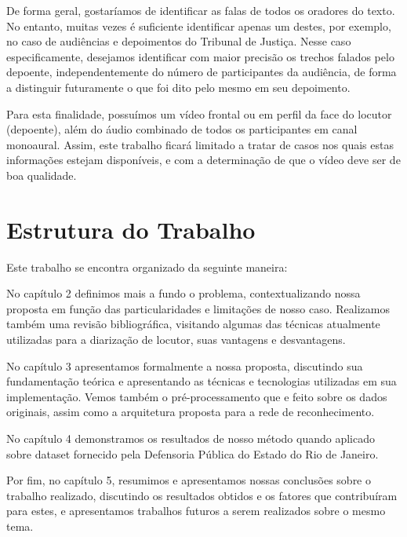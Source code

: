 De forma geral, gostaríamos de identificar as falas de todos os oradores do texto. No entanto, muitas vezes é suficiente identificar apenas um destes, por exemplo, no caso de audiências e depoimentos do Tribunal de Justiça. Nesse caso especificamente, desejamos identificar com maior precisão os trechos falados pelo depoente, independentemente do número de participantes da audiência, de forma a distinguir futuramente o que foi dito pelo mesmo em seu depoimento.

Para esta finalidade, possuímos um vídeo frontal ou em perfil da face do locutor (depoente), além do áudio combinado de todos os participantes em canal monoaural. Assim, este trabalho ficará limitado a tratar de casos nos quais estas informações estejam disponíveis, e com a determinação de que o vídeo deve ser de boa qualidade.

\section{Estrutura do Trabalho}

Este trabalho se encontra organizado da seguinte maneira:

No capítulo 2 definimos mais a fundo o problema, contextualizando nossa proposta em função das particularidades e limitações de nosso caso. Realizamos também uma revisão bibliográfica, visitando algumas das técnicas atualmente utilizadas para a diarização de locutor, suas vantagens e desvantagens.

No capítulo 3 apresentamos formalmente a nossa proposta, discutindo sua fundamentação teórica e apresentando as técnicas e tecnologias utilizadas em sua implementação. Vemos também o pré-processamento que e feito sobre os dados originais, assim como a arquitetura proposta para a rede de reconhecimento.

No capítulo 4 demonstramos os resultados de nosso método quando aplicado sobre dataset fornecido pela Defensoria Pública do Estado do Rio de Janeiro.

Por fim, no capítulo 5, resumimos e apresentamos nossas conclusões sobre o trabalho realizado, discutindo os resultados obtidos e os fatores que contribuíram para estes, e apresentamos trabalhos futuros a serem realizados sobre o mesmo tema.